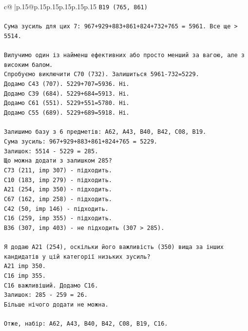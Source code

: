\documentclass{article}
\begin{document}
{\begin{supertabular}{c@{$\;$}|p{.15\linewidth}@{}p{.15\linewidth}p{.15\linewidth}p{.15\linewidth}p{.15\linewidth}p{.15\linewidth}}
{{{\texttt{B19 (765, 861)} \\
\\ 
\texttt{Сума зусиль для цих 7: 967+929+883+861+824+732+765 = 5961. Все ще > 5514.} \\
\\ 
\texttt{Вилучимо один із найменш ефективних або просто менший за вагою, але з високим балом.} \\
\texttt{Спробуємо виключити C70 (732). Залишиться 5961{-}732=5229.} \\
\texttt{Додамо C43 (707). 5229+707=5936. Ні.} \\
\texttt{Додамо C39 (684). 5229+684=5913. Ні.} \\
\texttt{Додамо C61 (551). 5229+551=5780. Ні.} \\
\texttt{Додамо C55 (689). 5229+689=5918. Ні.} \\
\\ 
\texttt{Залишимо базу з 6 предметів: A62, A43, B40, B42, C08, B19.} \\
\texttt{Сума зусиль: 967+929+883+861+824+765 = 5229.} \\
\texttt{Залишок: 5514 {-} 5229 = 285.} \\
\texttt{Що можна додати з залишком 285?} \\
\texttt{C73 (211, imp 307) {-} підходить.} \\
\texttt{C10 (183, imp 279) {-} підходить.} \\
\texttt{A21 (254, imp 350) {-} підходить.} \\
\texttt{C67 (162, imp 258) {-} підходить.} \\
\texttt{C42 (50, imp 146) {-} підходить.} \\
\texttt{C16 (259, imp 355) {-} підходить.} \\
\texttt{B36 (307, imp 403) {-} не підходить (307 > 285).} \\
\\ 
\texttt{Я додаю A21 (254), оскільки його важливість (350) вища за інших кандидатів у цій категорії низьких зусиль?} \\
\texttt{A21 imp 350.} \\
\texttt{C16 imp 355.} \\
\texttt{C16 важливіший. Додамо C16.} \\
\texttt{Залишок: 285 {-} 259 = 26.} \\
\texttt{Більше нічого додати не можна.} \\
\\ 
\texttt{Отже, набір: A62, A43, B40, B42, C08, B19, C16.} \\
}}}
\end{supertabular}}
\end{document}
